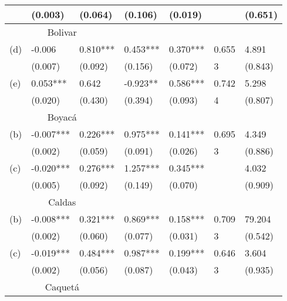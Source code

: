 \begin{table}[H]
\begin{tabular}{lllllll}
& \scriptsize{(0.003)} & \scriptsize{(0.064)} & \scriptsize{(0.106)} & \scriptsize{(0.019)} &       & \scriptsize{(0.651)} \\
\hline \multicolumn{3}{c}{Bolivar} &       &       &       &  \\
\vspace{-0.3cm} (d) & -0.006 & 0.810*** & 0.453*** & 0.370*** & 0.655 & 4.891\\   
& \scriptsize{(0.007)} & \scriptsize{(0.092)} & \scriptsize{(0.156)} & \scriptsize{(0.072)} & \scriptsize{3}     & \scriptsize{(0.843)} \\
\vspace{-0.3cm} (e)& 0.053*** & 0.642 & -0.923** & 0.586*** & 0.742 & 5.298\\   
& \scriptsize{(0.020)} & \scriptsize{(0.430)} & \scriptsize{(0.394)} & \scriptsize{(0.093)} & \scriptsize{4}     & \scriptsize{(0.807)} \\
\hline \multicolumn{3}{c}{Boyacá} &       &       &       &  \\
\vspace{-0.3cm} (b) & -0.007*** & 0.226*** & 0.975*** & 0.141*** & 0.695 & 4.349\\   
& \scriptsize{(0.002)} & \scriptsize{(0.059)} & \scriptsize{(0.091)} & \scriptsize{(0.026)} & \scriptsize{3}     & \scriptsize{(0.886)} \\
\vspace{-0.3cm} (c) & -0.020*** & 0.276*** & 1.257*** & 0.345*** &       & 4.032\\   
& \scriptsize{(0.005)} & \scriptsize{(0.092)} & \scriptsize{(0.149)} & \scriptsize{(0.070)} &       & \scriptsize{(0.909)} \\
\hline \multicolumn{3}{c}{Caldas} &       &       &       &  \\
\vspace{-0.3cm} (b) & -0.008*** & 0.321*** & 0.869*** & 0.158*** & 0.709 & 79.204\\   
& \scriptsize{(0.002)} & \scriptsize{(0.060)} & \scriptsize{(0.077)} & \scriptsize{(0.031)} & \scriptsize{3}     & \scriptsize{(0.542)} \\
\vspace{-0.3cm} (c) & -0.019*** & 0.484*** & 0.987*** & 0.199*** & 0.646 & 3.604\\   
& \scriptsize{(0.002)} & \scriptsize{(0.056)} & \scriptsize{(0.087)} & \scriptsize{(0.043)} & \scriptsize{3}     & \scriptsize{(0.935)} \\
\hline \multicolumn{3}{c}{Caquetá} &       &       &       &  \\

\end{tabular}
\end{table}
